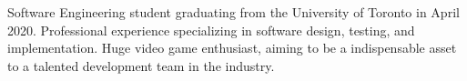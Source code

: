 

\begin{cvparagraph}

Software Engineering student graduating from the University of Toronto in April 2020. Professional experience specializing in software design, testing, and implementation. Huge video game enthusiast, aiming to be a indispensable asset to a talented development team in the industry.
\end{cvparagraph}
